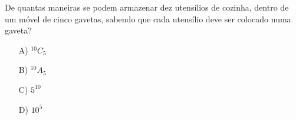 De quantas maneiras se podem armazenar dez utensílios de cozinha, dentro de um móvel de cinco gavetas, sabendo que cada utensílio deve ser colocado numa gaveta?
\begin{enumerate}
\item [A)] $^10C_5$
\item [B)] $^10A_5$
\item [C)] $5^{10}$
\item [D)] $10^5$
\end{enumerate}